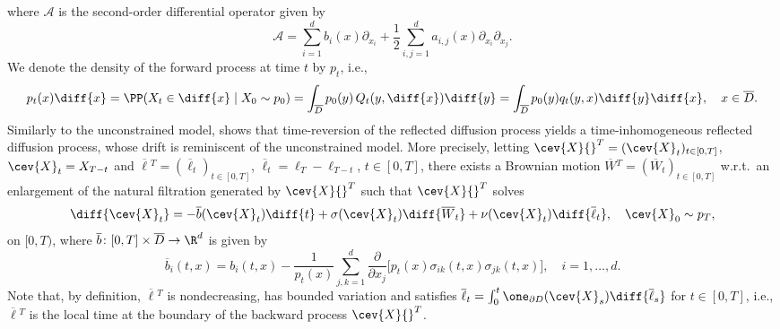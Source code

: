 \documentclass[a4paper, 11pt, headings = small, abstract]{scrartcl}
\begin{document}
where $\mathcal{A}$ is the second-order differential operator given by 
\[\mathcal{A} = \sum_{i=1}^d b_i(x) \partial_{x_i} + \frac{1}{2}\sum_{i,j=1}^d a_{i,j}(x) \partial_{x_i} \partial_{x_j}.\]
We denote the density of the forward process at time $t$ by $p_t$, i.e., 
\[p_t(x) \diff{x} = \PP(X_t \in \diff{x}\mid X_0 \sim p_0) = \int_{\overline{D}} p_0(y) \,Q_{t}(y,\diff{x}) \diff{y} = \int_{\overline{D}} p_0(y) q_{t}(y,x) \diff{y} \diff{x}, \quad x \in \overline{D}.\]
Similarly to the unconstrained model, \cite[Theorem 2.5]{cattiaux88} shows that time-reversion of the reflected diffusion process yields a time-inhomogeneous reflected diffusion process, whose drift is reminiscent of the unconstrained model. 
More precisely, letting $\cev{X}{}^T = (\cev{X}_t)_{t \in [0,T]}$, $\cev{X}_t = X_{T-t}$ and $\overline{\ell}{}^T = (\overline{\ell}_t)_{t \in [0,T]}$, $\overline{\ell}_t = \ell_{T} - \ell_{T-t}$, $t \in [0,T]$, there exists a Brownian motion $\overline{W}{}^T = (\overline{W}_t)_{t \in [0,T]}$ w.r.t.\ an enlargement of the natural filtration generated by $\cev{X}{}^T$ such that $\cev{X}{}^T$ solves 
\begin{equation}\label{eq:rsde_reflect}
\diff{\cev{X}_t} = -\overline{b}( \cev{X}_t)\diff{t}+\sigma(\cev{X}_t)\diff{\overline{W}_t} + \nu(\cev{X}_t) \diff{\overline{\ell}_t}, \quad \cev{X}_0 \sim p_T,
\end{equation}
on $[0,T)$, where $\overline{b}\colon [0,T] \times \overline{D} \to \R^d$ is given by 
\[
	\overline{b}_i(t, x)=b_i(t, x)-\frac{1}{p_t(x)}\sum_{j, k=1}^{d}\frac{\partial}{\partial x_j}\big[p_t(x)\sigma_{ik}(t, x)\sigma_{jk}(t, x)\big],\quad i=1,\ldots,d.
\]
Note that, by definition, $\overline{\ell}{}^T$ is nondecreasing, has bounded variation and satisfies $\overline{\ell}_t = \int_0^t \one_{\partial D}(\cev{X}_s) \diff{\overline{\ell}_s}$ for $t \in [0,T]$, i.e., $\overline{\ell}{}^T$ is the local time at the boundary of the backward process $\cev{X}{}^T$.
\end{document}

